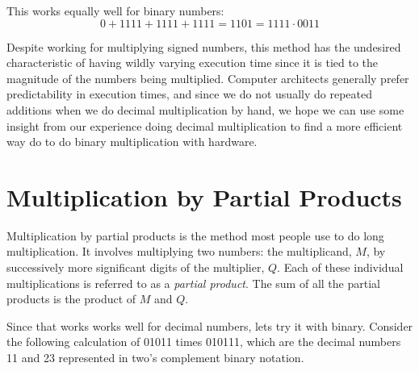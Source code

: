 \documentclass{article}
\begin{document}
This works equally well for binary numbers: %
\begin{equation}
0 + 1111 + 1111 + 1111 = 1101 = 1111 \cdot 0011
\end{equation}

Despite working for multiplying signed numbers, this method has the undesired characteristic of having wildly varying execution time since it is tied to the magnitude of the numbers being multiplied.
Computer architects generally prefer predictability in execution times, and since we do not usually do repeated additions when we do decimal multiplication by hand, we hope we can use some insight from our experience doing decimal multiplication to find a more efficient way do to do binary multiplication with hardware.

\section{Multiplication by Partial Products}
Multiplication by partial products is the method most people use to do long multiplication.
It involves multiplying two numbers: the multiplicand, $M$, by successively more significant digits of the multiplier, $Q$.%
Each of these individual multiplications is referred to as a \textsl{partial product}.
The sum of all the partial products is the product of $M$ and $Q$.


Since that works works well for decimal numbers, lets try it with binary.
Consider the following calculation of 01011 times 010111, which are the decimal numbers 11 and 23 represented in two's complement binary notation.
\end{document}
